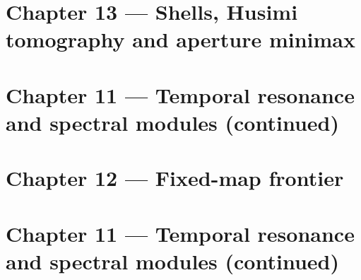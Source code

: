 \documentclass[11pt,a4paper]{article}
\numberwithin{equation}{section}
\begin{document}
\part*{Chapter 13 --- Shells, Husimi tomography and aperture minimax}








\part*{Chapter 11 --- Temporal resonance and spectral modules (continued)}

\part*{Chapter 12 --- Fixed-map frontier}























\part*{Chapter 11 --- Temporal resonance and spectral modules (continued)}

\end{document}
